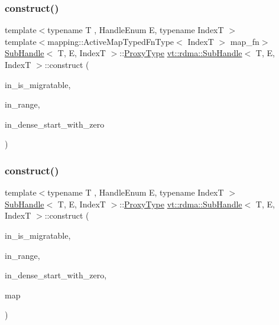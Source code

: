 \mbox{\label{structvt_1_1rdma_1_1_sub_handle_a804b2836bdb4b3ce26d9180cb775993c}} 
\subsubsection{\texorpdfstring{construct()}{construct()}\hspace{0.1cm}{\footnotesize\ttfamily [1/2]}}
{\footnotesize\ttfamily template$<$typename T , Handle\+Enum E, typename IndexT $>$ \\
template$<$mapping\+::\+Active\+Map\+Typed\+Fn\+Type$<$ Index\+T $>$ map\+\_\+fn$>$ \\
\hyperlink{structvt_1_1rdma_1_1_sub_handle}{Sub\+Handle}$<$ T, E, IndexT $>$\+::\hyperlink{structvt_1_1rdma_1_1_sub_handle_a758bee2e499658cfef92ace83eea6590}{Proxy\+Type} \hyperlink{structvt_1_1rdma_1_1_sub_handle}{vt\+::rdma\+::\+Sub\+Handle}$<$ T, E, IndexT $>$\+::construct (\begin{DoxyParamCaption}\item[{bool}]{in\+\_\+is\+\_\+migratable,  }\item[{IndexT}]{in\+\_\+range,  }\item[{bool}]{in\+\_\+dense\+\_\+start\+\_\+with\+\_\+zero }\end{DoxyParamCaption})\hspace{0.3cm}{\ttfamily [static]}}

\mbox{\label{structvt_1_1rdma_1_1_sub_handle_a6c2f157dfe0ab8af4e049d2039667906}} 
\subsubsection{\texorpdfstring{construct()}{construct()}\hspace{0.1cm}{\footnotesize\ttfamily [2/2]}}
{\footnotesize\ttfamily template$<$typename T , Handle\+Enum E, typename IndexT $>$ \\
\hyperlink{structvt_1_1rdma_1_1_sub_handle}{Sub\+Handle}$<$ T, E, IndexT $>$\+::\hyperlink{structvt_1_1rdma_1_1_sub_handle_a758bee2e499658cfef92ace83eea6590}{Proxy\+Type} \hyperlink{structvt_1_1rdma_1_1_sub_handle}{vt\+::rdma\+::\+Sub\+Handle}$<$ T, E, IndexT $>$\+::construct (\begin{DoxyParamCaption}\item[{bool}]{in\+\_\+is\+\_\+migratable,  }\item[{IndexT}]{in\+\_\+range,  }\item[{bool}]{in\+\_\+dense\+\_\+start\+\_\+with\+\_\+zero,  }\item[{\hyperlink{namespacevt_af64846b57dfcaf104da3ef6967917573}{vt\+::\+Handler\+Type}}]{map }\end{DoxyParamCaption})\hspace{0.3cm}{\ttfamily [static]}}

